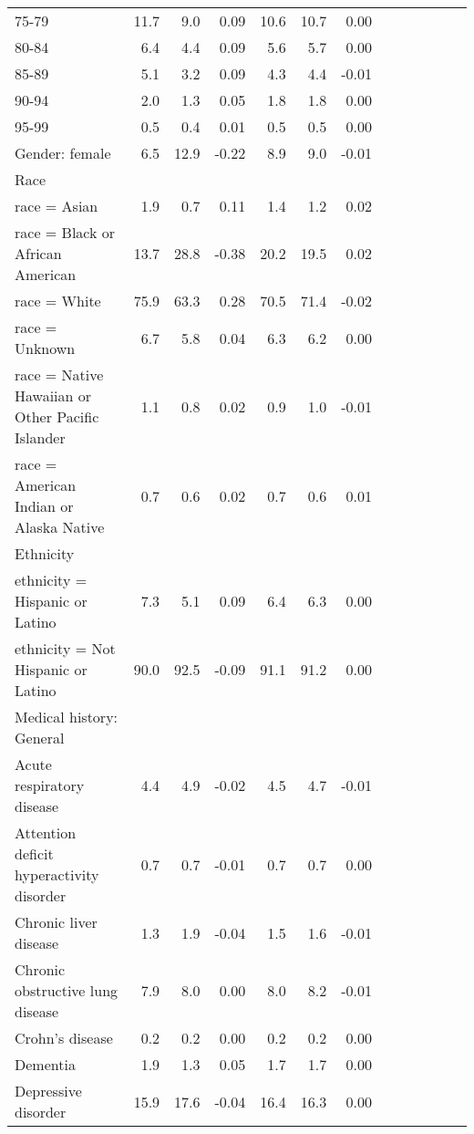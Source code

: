 \documentclass[11pt,]{article}
\begin{document}
\begin{longtable}{lrrrrrrrrrrrr}
      75-79 & 11.7 &  9.0 &  0.09 & 10.6 & 10.7 &  0.00 \\ 
      80-84 &  6.4 &  4.4 &  0.09 &  5.6 &  5.7 &  0.00 \\ 
      85-89 &  5.1 &  3.2 &  0.09 &  4.3 &  4.4 & -0.01 \\ 
      90-94 &  2.0 &  1.3 &  0.05 &  1.8 &  1.8 &  0.00 \\ 
      95-99 &  0.5 &  0.4 &  0.01 &  0.5 &  0.5 &  0.00 \\ 
  Gender: female &  6.5 & 12.9 & -0.22 &  8.9 &  9.0 & -0.01 \\ 
  Race &    &    &     &    &    &     \\ 
      race = Asian &  1.9 &  0.7 &  0.11 &  1.4 &  1.2 &  0.02 \\ 
      race = Black or African American & 13.7 & 28.8 & -0.38 & 20.2 & 19.5 &  0.02 \\ 
      race = White & 75.9 & 63.3 &  0.28 & 70.5 & 71.4 & -0.02 \\ 
      race = Unknown &  6.7 &  5.8 &  0.04 &  6.3 &  6.2 &  0.00 \\ 
      race = Native Hawaiian or Other Pacific Islander &  1.1 &  0.8 &  0.02 &  0.9 &  1.0 & -0.01 \\ 
      race = American Indian or Alaska Native &  0.7 &  0.6 &  0.02 &  0.7 &  0.6 &  0.01 \\ 
  Ethnicity &    &    &     &    &    &     \\ 
      ethnicity = Hispanic or Latino &  7.3 &  5.1 &  0.09 &  6.4 &  6.3 &  0.00 \\ 
      ethnicity = Not Hispanic or Latino & 90.0 & 92.5 & -0.09 & 91.1 & 91.2 &  0.00 \\ 
  Medical history: General &    &    &     &    &    &     \\ 
      Acute respiratory disease &  4.4 &  4.9 & -0.02 &  4.5 &  4.7 & -0.01 \\ 
      Attention deficit hyperactivity disorder &  0.7 &  0.7 & -0.01 &  0.7 &  0.7 &  0.00 \\ 
      Chronic liver disease &  1.3 &  1.9 & -0.04 &  1.5 &  1.6 & -0.01 \\ 
      Chronic obstructive lung disease &  7.9 &  8.0 &  0.00 &  8.0 &  8.2 & -0.01 \\ 
      Crohn's disease &  0.2 &  0.2 &  0.00 &  0.2 &  0.2 &  0.00 \\ 
      Dementia &  1.9 &  1.3 &  0.05 &  1.7 &  1.7 &  0.00 \\ 
      Depressive disorder & 15.9 & 17.6 & -0.04 & 16.4 & 16.3 &  0.00 \\ 

\end{longtable}
\end{document}

